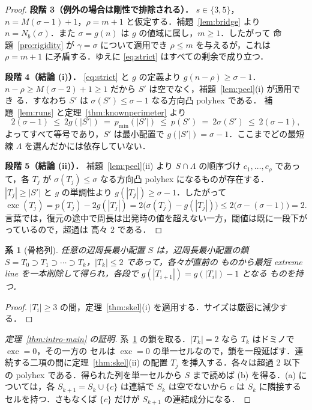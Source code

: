 \documentclass[11pt]{article}
\theoremstyle{plain}
\newtheorem{corollary}[theorem]{系}
\theoremstyle{definition}
\theoremstyle{remark}
\DeclareMathOperator{\exc}{exc}
\begin{document}
\begin{proof}
\medskip\noindent\textbf{段階 3（例外の場合は剛性で排除される）．}
\(s\in\{3,5\}\)，\(n=M(\sigma-1)+1\)，\(\rho=m+1\) と仮定する．補題~\ref{lem:bridge} より
\(n=N_{b}(\sigma)\)．また \(\sigma=g(n)\) は \(g\) の値域に属し，\(m\ge1\)．したがって
命題~\ref{pro:rigidity} が \(\gamma=\sigma\) について適用でき \(\rho\le m\) を与えるが，これは
\(\rho=m+1\) に矛盾する．ゆえに \eqref{eq:strict} はすべての剰余で成り立つ．

\medskip\noindent\textbf{段階 4（結論 (i)）．}
\eqref{eq:strict} と \(g\) の定義より \(g(n-\rho)\ge\sigma-1\)．
\(n-\rho\ge M(\sigma-2)+1\ge1\) だから \(S'\) は空でなく，補題~\ref{lem:peel}(i) が適用でき
る．すなわち \(S'\) は \(\sigma(S')\le\sigma-1\) なる方向凸 polyhex である．
補題~\ref{lem:runs} と定理~\ref{thm:knownperimeter} より
\[
   2(\sigma-1)\ \le\ 2g(|S'|)\ =\ p_{\min}(|S'|)\ \le\ p(S')\ =\ 2\sigma(S')\ \le\ 2(\sigma-1),
\]
よってすべて等号であり，\(S'\) は最小配置で \(g(|S'|)=\sigma-1\)．ここまでどの最短線
\(\Lambda\) を選んだかには依存していない．

\medskip\noindent\textbf{段階 5（結論 (ii)）．}
補題~\ref{lem:peel}(ii) より \(S\cap\Lambda\) の順序づけ \(c_{1},\dots,c_{\rho}\) であって，各
\(T_{j}\) が \(\sigma(T_{j})\le\sigma\) なる方向凸 polyhex になるものが存在する．
\(|T_{j}|\ge|S'|\) と \(g\) の単調性より \(g(|T_{j}|)\ge\sigma-1\)．したがって
\[
   \exc(T_{j})=p(T_{j})-2g(|T_{j}|)=2\bigl(\sigma(T_{j})-g(|T_{j}|)\bigr)
   \le2\bigl(\sigma-(\sigma-1)\bigr)=2 .
\]
言葉では，復元の途中で周長は出発時の値を超えない一方，閾値は既に一段下がっているので，超過は
高々 2 である．
\end{proof}

\begin{corollary}[骨格列]\label{cor:skel}
任意の辺周長最小配置 \(S\) は，辺周長最小配置の鎖
\(S=T_{0}\supset T_{1}\supset\cdots\supset T_{k}\)，\(|T_{k}|\le2\) であって，各々が直前の
ものから最短 extreme line を一本削除して得られ，各段で \(g(|T_{i+1}|)=g(|T_{i}|)-1\) となる
ものを持つ．
\end{corollary}

\begin{proof}
\(|T_{i}|\ge3\) の間，定理~\ref{thm:skel}(i) を適用する．サイズは厳密に減少する．
\end{proof}

\begin{proof}[定理~\ref{thm:intro-main} の証明]
系~\ref{cor:skel} の鎖を取る．\(|T_{k}|=2\) なら \(T_{k}\) はドミノで \(\exc=0\)，その一方の
セルは \(\exc=0\) の単一セルなので，鎖を一段延ばす．連続する二項の間に定理~\ref{thm:skel}(ii)
の配置 \(T_{j}\) を挿入する．各々は超過 2 以下の polyhex である．得られた列を単一セルから
\(S\) まで読めば (b) を得る．(a) については，各 \(S_{k+1}=S_{k}\cup\{c\}\) は連結で \(S_{k}\)
は空でないから \(c\) は \(S_{k}\) に隣接するセルを持つ．さもなくば \(\{c\}\) だけが
\(S_{k+1}\) の連結成分になる．
\end{proof}
\end{document}
